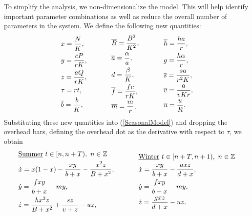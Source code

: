 \documentclass[12pt]{UOthesis}
\theoremstyle{remarkstyle}
\begin{document}
To simplify the analysis, we non-dimensionalize the model. This will help identify important parameter combinations as well as reduce the overall number of parameters in the system. We define the following new quantities:
\begin{equation*}
	\begin{split}
		&x=\frac{N}{K},\\
		&y=\frac{cP}{rK},\\
		&z=\frac{aQ}{rK},\\
		&\tau=rt,\\
		&\overline{b}=\frac{b}{K},
	\end{split}
	\hspace{0.5in}
	\begin{split}
		&\overline{B}=\frac{B^2}{K^2},\\
		&\overline{a}=\frac{\alpha}{a},\\
		&d=\frac{\beta}{K},\\
		&\overline{f}=\frac{fc}{rK},\\
		&\overline{m}=\frac{m}{r},
	\end{split}
	\hspace{0.5in}
	\begin{split}
		&\overline{h}=\frac{ha}{r},\\
		&g=\frac{h\alpha}{r},\\
		&\overline{s}=\frac{sa}{r^2K},\\
		&\overline{v}=\frac{a}{vKr},\\
		&\overline{u}=\frac{u}{R}.
	\end{split}
\end{equation*}
Substituting these new quantities into (\ref{SeasonalModel}) and dropping the overhead bars, defining the overhead dot as the derivative with respect to $\tau$, we obtain
\begin{equation}
	\begin{split}
		&\underline{\text{Summer}}\ t\in [n,n+T),\ n\in \mathbb Z\\
		&\dot{x}=x(1-x)-\frac{xy}{b+x}-\frac{x^2 z}{B+x^2},\\
		&\dot{y}=\frac{fxy}{b+x}-my,\\
		&\dot{z}=\frac{hx^2z}{B+x^2}+\frac{sz}{v+z}-uz,
		\end{split}
		\hspace{0.5in}
		\begin{split}
		&\underline{\text{Winter}}\ t\in [n+T,n+1),\ n\in \mathbb Z\\
		&\dot{x}=\frac{xy}{b+x}-\frac{axz}{d+x},\\
		&\dot{y}=\frac{fxy}{b+x}-my,\\
		&\dot{z}=\frac{gxz}{d+x}-uz.
	\end{split}
	\label{NonDimSeasonalModel}
\end{equation}
\end{document}
